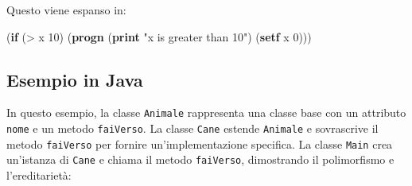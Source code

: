 \documentclass[
  letterpaper,
  DIV=11,
  numbers=noendperiod]{scrreprt}
\newenvironment{Shaded}{\begin{snugshade}}{\end{snugshade}}
\newcommand{\DecValTok}[1]{\textcolor[rgb]{0.68,0.00,0.00}{#1}}
\newcommand{\KeywordTok}[1]{\textcolor[rgb]{0.00,0.23,0.31}{\textbf{#1}}}
\newcommand{\NormalTok}[1]{\textcolor[rgb]{0.00,0.23,0.31}{#1}}
\newcommand{\OperatorTok}[1]{\textcolor[rgb]{0.37,0.37,0.37}{#1}}
\newcommand{\StringTok}[1]{\textcolor[rgb]{0.13,0.47,0.30}{#1}}
\begin{document}
Questo viene espanso in:

\begin{Shaded}
\begin{Highlighting}[]
\NormalTok{(}\KeywordTok{if}\NormalTok{ (}\OperatorTok{\textgreater{}}\NormalTok{ x }\DecValTok{10}\NormalTok{)}
\NormalTok{    (}\KeywordTok{progn}
\NormalTok{      (}\KeywordTok{print} \StringTok{"x is greater than 10"}\NormalTok{)}
\NormalTok{      (}\KeywordTok{setf}\NormalTok{ x }\DecValTok{0}\NormalTok{)))}
\end{Highlighting}
\end{Shaded}

\subsection{Esempio in Java}\label{esempio-in-java}

In questo esempio, la classe \texttt{Animale} rappresenta una classe
base con un attributo \texttt{nome} e un metodo \texttt{faiVerso}. La
classe \texttt{Cane} estende \texttt{Animale} e sovrascrive il metodo
\texttt{faiVerso} per fornire un'implementazione specifica. La classe
\texttt{Main} crea un'istanza di \texttt{Cane} e chiama il metodo
\texttt{faiVerso}, dimostrando il polimorfismo e l'ereditarietà:
\end{document}
